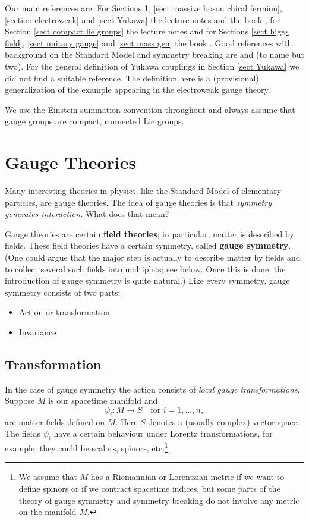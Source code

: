 \documentclass[12pt]{amsart}
\theoremstyle{definition}
\theoremstyle{remark}
\numberwithin{equation}{section}
\begin{document}
Our main references are: For Sections \ref{sect gauge theories}, \ref{sect massive boson chiral fermion}, \ref{section electroweak} and \ref{sect Yukawa} the lecture notes \cite{Louis} and the book \cite{Mosel}, for Section \ref{sect compact lie groups} the lecture notes \cite{Ziller} and for Sections \ref{sect higgs field}, \ref{sect unitary gauge} and \ref{sect mass gen} the book \cite{Bleecker}. Good references with background on the Standard Model and symmetry breaking are \cite{Robinson} and \cite{Ryder} (to name but two). For the general definition of Yukawa couplings in Section \ref{sect Yukawa} we did not find a suitable reference. The definition here is a (provisional) generalization of the example appearing in the electroweak gauge theory. 

We use the Einstein summation convention throughout and always assume that gauge groups are compact, connected Lie groups.

\section{Gauge Theories}\label{sect gauge theories}

Many interesting theories in physics, like the Standard Model of elementary particles, are gauge theories. The idea of gauge theories is that {\em symmetry generates interaction}. What does that mean?

Gauge theories are certain {\bf field theories}; in particular, matter is described by fields. These field theories have a certain symmetry, called {\bf gauge symmetry}. (One could argue that the major step is actually to describe matter by fields and to collect several such fields into multiplets; see below. Once this is done, the introduction of gauge symmetry is quite natural.) Like every symmetry, gauge symmetry consists of two parts:
\begin{itemize}
\item Action or transformation
\item Invariance
\end{itemize}
\subsection{Transformation}
In the case of gauge symmetry the action consists of {\em local gauge transformations}. Suppose $M$ is our spacetime manifold and 
\begin{equation*}
\psi_i\colon M\longrightarrow S\quad\text{for $i=1,\ldots,n$},
\end{equation*}
are matter fields defined on $M$. Here $S$ denotes a (usually complex) vector space. The fields $\psi_i$ have a certain behaviour under Lorentz transformations, for example, they could be scalars, spinors, etc.\footnote{We assume that $M$ has a Riemannian or Lorentzian metric if we want to define spinors or if we contract spacetime indices, but some parts of the theory of gauge symmetry and symmetry breaking do not involve any metric on the manifold $M$.}
\end{document}
